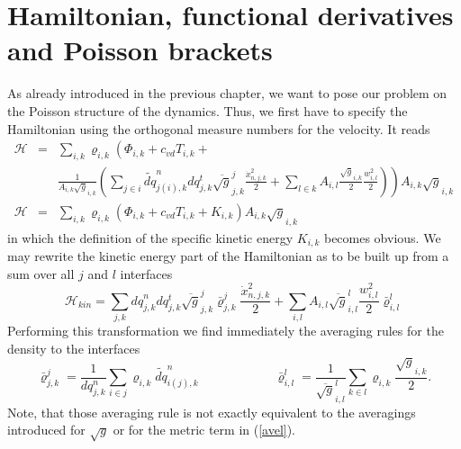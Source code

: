 \section{Hamiltonian, functional derivatives and Poisson brackets\label{poisson}}
As already introduced in the previous chapter, we want to pose our problem on the Poisson structure of the dynamics. Thus, we first have to specify the
Hamiltonian using the orthogonal measure numbers for the velocity. It reads
\begin{eqnarray*}
 \mathcal{H}&=&\sum_{i,k}\varrho_{i,k}
             \left(\Phi_{i,k}+c_{vd}T_{i,k}+\right.\\
&&\left.\frac{1}{A_{i,k}\sqrt{g}_{i,k}}\left(
             \sum_{j\in i} \widetilde{dq}^{n}_{j(i),k}dq^{t}_{j,k}\overline{\sqrt{g}}^j_{j,k}
             \frac{\dot{x}_{n,j,k}^2}{2} +
             \sum_{l\in k} A_{i,l}\frac{\sqrt{g}_{i,k}}{2}
             \frac{w_{i,l}^2}{2}
             \right)\right)A_{i,k}\sqrt{g}_{i,k}\\
\mathcal{H}&=&\sum_{i,k}\varrho_{i,k}(\Phi_{i,k}+c_{vd}T_{i,k}+K_{i,k})A_{i,k}\sqrt{g}_{i,k}
\end{eqnarray*}
in which the definition of the specific kinetic energy $K_{i,k}$ becomes obvious.
We may rewrite the kinetic energy part of the Hamiltonian as to be built up from a sum over all $j$ and $l$ interfaces
\begin{displaymath}
 \mathcal{H}_{kin}=\sum_{j,k} {dq}^{n}_{j,k}dq^{t}_{j,k}\overline{\sqrt{g}}^j_{j,k}\bar{\varrho}^{j}_{j,k}
             \frac{\dot{x}_{n,j,k}^2}{2} +
             \sum_{i,l} A_{i,l}\overline{\sqrt{g}}^l_{i,l}
             \frac{w_{i,l}^2}{2}\bar{\varrho}^{l}_{i,l}
\end{displaymath}
Performing this transformation we find immediately the averaging rules for the density to the interfaces
\begin{displaymath}
 \bar{\varrho}^j_{j,k} = \frac{1}{dq^n_{j,k}}\sum_{i\in j}\varrho_{i,k}\widetilde{dq}^n_{i(j),k}
\qquad\qquad\qquad
 \bar{\varrho}^l_{i,l} = \frac{1}{\overline{\sqrt{g}}^l_{i,l}}\sum_{k\in l}\varrho_{i,k}\frac{\sqrt{g}_{i,k}}{2}.
\end{displaymath}
Note, that those averaging rule is not exactly equivalent to the averagings
introduced for $\sqrt{g}$ or for the metric term in (\ref{avel}).

